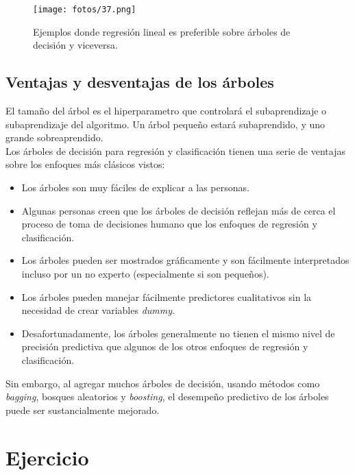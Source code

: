 \begin{figure}[h]
\centering
\texttt{[image: fotos/37.png]}
\caption{Ejemplos donde regresión lineal es preferible sobre árboles de decisión y viceversa.}
\label{fig:6.88}
\end{figure}

\subsection{Ventajas y desventajas de los árboles}

El tamaño del árbol es el hiperparametro que controlará el subaprendizaje o subaprendizaje del algoritmo. Un árbol pequeño estará subaprendido, y uno grande sobreaprendido. \\

Los árboles de decisión para regresión y clasificación tienen una serie de ventajas sobre los enfoques más clásicos vistos:
\begin{itemize}
    \item Los árboles son muy fáciles de explicar a las personas.
    \item Algunas personas creen que los árboles de decisión reflejan más de cerca el proceso de toma de decisiones humano que los enfoques de regresión y clasificación.
    \item Los árboles pueden ser mostrados gráficamente y son fácilmente interpretados incluso por un no experto (especialmente si son pequeños).
    \item Los árboles pueden manejar fácilmente predictores cualitativos sin la necesidad de crear variables \textit{dummy}.
    \item Desafortunadamente, los árboles generalmente no tienen el mismo nivel de precisión predictiva que algunos de los otros enfoques de regresión y clasificación.
\end{itemize}

Sin embargo, al agregar muchos árboles de decisión, usando métodos como \textit{bagging}, bosques aleatorios y \textit{boosting}, el desempeño predictivo de los árboles puede ser sustancialmente mejorado. 

\newpage 

\section{Ejercicio}

